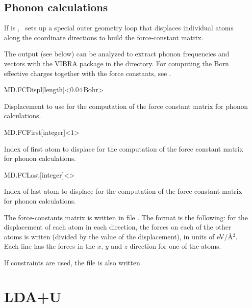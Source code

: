 \subsection{Phonon calculations}

If  is , \siesta\ sets up a special outer
geometry loop that displaces individual atoms along the coordinate
directions to build the force-constant matrix.

The output (see below) can be analyzed to extract phonon frequencies
and vectors with the VIBRA package in the 
directory. For computing the Born effective charges together with the
force constants, see .

\begin{fdfentry}{MD.FCDispl}[length]<$0.04\,\mathrm{Bohr}$>
  
  Displacement to use for the computation of the force constant
  matrix for phonon calculations.

\end{fdfentry}

\begin{fdfentry}{MD.FCFirst}[integer]<$1$>
  
  Index of first atom to displace for the computation of the force
  constant matrix for phonon
  calculations.

\end{fdfentry}

\begin{fdfentry}{MD.FCLast}[integer]<>

  Index of last atom to displace for the computation of the force
  constant matrix for phonon
  calculations.

\end{fdfentry}

The force-constants matrix is written in file .  The
format is the following: for the displacement of each atom in each
direction, the forces on each of the other atoms is writen (divided by
the value of the displacement), in units of eV/\AA$^2$. Each line has
the forces in the $x$, $y$ and $z$ direction for one of the atoms.

If constraints are used, the file  is also written.


\section{LDA+U}
\label{sec:lda+u}

